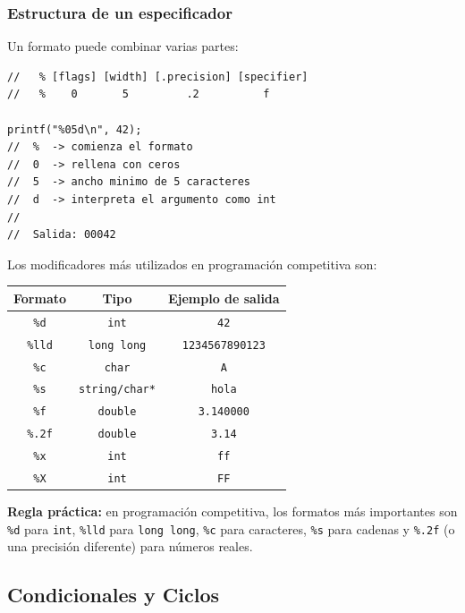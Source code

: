 \documentclass[10pt,a4paper,twocolumn]{article}
\begin{document}
\subsubsection*{Estructura de un especificador}

Un formato puede combinar varias partes:

\begin{lstlisting}[style=cpp]
//   % [flags] [width] [.precision] [specifier]
//   %    0       5         .2          f

printf("%05d\n", 42);
//  %  -> comienza el formato
//  0  -> rellena con ceros
//  5  -> ancho minimo de 5 caracteres
//  d  -> interpreta el argumento como int
//
//  Salida: 00042
\end{lstlisting}

Los modificadores más utilizados en programación competitiva son:

\begin{center}
\begin{tabular}{|c|c|c|}
\hline
\textbf{Formato} & \textbf{Tipo} & \textbf{Ejemplo de salida} \\
\hline
\texttt{\%d} & \texttt{int} & \texttt{42} \\
\hline
\texttt{\%lld} & \texttt{long long} & \texttt{1234567890123} \\
\hline
\texttt{\%c} & \texttt{char} & \texttt{A} \\
\hline
\texttt{\%s} & \texttt{string/char*} & \texttt{hola} \\
\hline
\texttt{\%f} & \texttt{double} & \texttt{3.140000} \\
\hline
\texttt{\%.2f} & \texttt{double} & \texttt{3.14} \\
\hline
\texttt{\%x} & \texttt{int} & \texttt{ff} \\
\hline
\texttt{\%X} & \texttt{int} & \texttt{FF} \\
\hline
\end{tabular}
\end{center}

\textbf{Regla práctica:} en programación competitiva, los formatos más
importantes son \texttt{\%d} para \texttt{int}, \texttt{\%lld} para
\texttt{long long}, \texttt{\%c} para caracteres, \texttt{\%s} para cadenas
y \texttt{\%.2f} (o una precisión diferente) para números reales.


\subsection{Condicionales y Ciclos}
\end{document}
